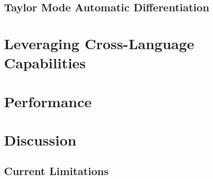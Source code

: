\subsection{Taylor Mode Automatic Differentiation}
\label{subsec:taylor_mode_automatic_differentiation}

\section{Leveraging Cross-Language Capabilities}
\label{sec:cross_language_capabilities}


\section{Performance}
\label{sec:performance_lux}


\section{Discussion}
\label{sec:discussion_lux}

\subsection{Current Limitations}
\label{subsec:current_limitations}

